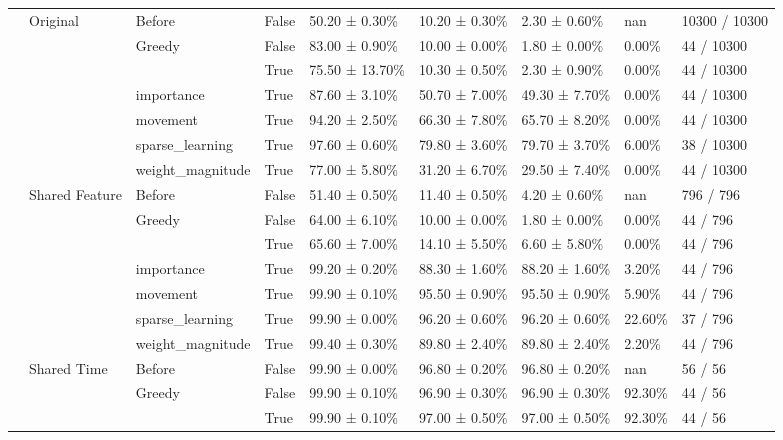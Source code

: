 \begin{tabular}{lllllllll}
\cline{2-9} \cline{3-9}
 & \multirow[t]{7}{*}{Original} & Before & False & 50.20 ± 0.30\% & 10.20 ± 0.30\% & 2.30 ± 0.60\% & nan & 10300 / 10300 \\
\cline{3-9}
 &  & \multirow[t]{2}{*}{Greedy} & False & 83.00 ± 0.90\% & 10.00 ± 0.00\% & 1.80 ± 0.00\% & 0.00\% & 44 / 10300 \\
 &  &  & True & 75.50 ± 13.70\% & 10.30 ± 0.50\% & 2.30 ± 0.90\% & 0.00\% & 44 / 10300 \\
\cline{3-9}
 &  & importance & True & 87.60 ± 3.10\% & 50.70 ± 7.00\% & 49.30 ± 7.70\% & 0.00\% & 44 / 10300 \\
\cline{3-9}
 &  & movement & True & 94.20 ± 2.50\% & 66.30 ± 7.80\% & 65.70 ± 8.20\% & 0.00\% & 44 / 10300 \\
\cline{3-9}
 &  & sparse\_learning & True & 97.60 ± 0.60\% & 79.80 ± 3.60\% & 79.70 ± 3.70\% & 6.00\% & 38 / 10300 \\
\cline{3-9}
 &  & weight\_magnitude & True & 77.00 ± 5.80\% & 31.20 ± 6.70\% & 29.50 ± 7.40\% & 0.00\% & 44 / 10300 \\
\cline{2-9} \cline{3-9}
 & \multirow[t]{7}{*}{Shared Feature} & Before & False & 51.40 ± 0.50\% & 11.40 ± 0.50\% & 4.20 ± 0.60\% & nan & 796 / 796 \\
\cline{3-9}
 &  & \multirow[t]{2}{*}{Greedy} & False & 64.00 ± 6.10\% & 10.00 ± 0.00\% & 1.80 ± 0.00\% & 0.00\% & 44 / 796 \\
 &  &  & True & 65.60 ± 7.00\% & 14.10 ± 5.50\% & 6.60 ± 5.80\% & 0.00\% & 44 / 796 \\
\cline{3-9}
 &  & importance & True & 99.20 ± 0.20\% & 88.30 ± 1.60\% & 88.20 ± 1.60\% & 3.20\% & 44 / 796 \\
\cline{3-9}
 &  & movement & True & 99.90 ± 0.10\% & 95.50 ± 0.90\% & 95.50 ± 0.90\% & 5.90\% & 44 / 796 \\
\cline{3-9}
 &  & sparse\_learning & True & 99.90 ± 0.00\% & 96.20 ± 0.60\% & 96.20 ± 0.60\% & 22.60\% & 37 / 796 \\
\cline{3-9}
 &  & weight\_magnitude & True & 99.40 ± 0.30\% & 89.80 ± 2.40\% & 89.80 ± 2.40\% & 2.20\% & 44 / 796 \\
\cline{2-9} \cline{3-9}
 & \multirow[t]{7}{*}{Shared Time} & Before & False & 99.90 ± 0.00\% & 96.80 ± 0.20\% & 96.80 ± 0.20\% & nan & 56 / 56 \\
\cline{3-9}
 &  & \multirow[t]{2}{*}{Greedy} & False & 99.90 ± 0.10\% & 96.90 ± 0.30\% & 96.90 ± 0.30\% & 92.30\% & 44 / 56 \\
 &  &  & True & 99.90 ± 0.10\% & 97.00 ± 0.50\% & 97.00 ± 0.50\% & 92.30\% & 44 / 56 \\

\end{tabular}
